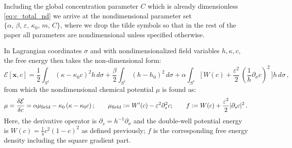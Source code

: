 \documentclass[
aip,
jcp,
reprint, 
floatfix
]{revtex4-1}
\begin{document}
Including the global concentration parameter $C$ which is already dimensionless  \eqref{eq:c_total_nd} we arrive at the nondimensional parameter set  $\{{\alpha},\,{\beta},\,{\varepsilon},\,{\kappa}_0,\, m,\,{C}\}$, where we drop the tilde symbols so that in the rest of the paper all parameters are nondimensional unless specified otherwise.

\begin{widetext}
In Lagrangian coordinates $\sigma$ and with nondimensionalized field variables $h, \kappa, c$, the free energy then takes the non-dimensional form:
\begin{equation}
\mathcal{E}[\mathbf{x},c]
=\frac{1}{2}\int_{S^1} (\kappa-\kappa_0 c)^2h\,d\sigma
+\frac{\beta}{2}\int_{S^1}(h-h_0)^2\,d\sigma
+\alpha\int_{S^1}\Big[\,W(c)+\frac{\varepsilon^2}{2}\,(\frac1h\partial_\sigma c)^2\,\Big]h \,d \sigma\,,
\label{eq:energy_full_nd}
\end{equation}
from which the nondimensional chemical potential $\mu$ is found as:
\begin{equation} \label{eq:chemical_potential_nd}
\mu=\frac{\delta \mathcal{E}}{\delta c}=\alpha\mu_{\rm field}-\kappa_0\left(\kappa-\kappa_0 c\right); \qquad \mu_{\rm field}:=W'(c)-\varepsilon^2 \partial_s^2c; \qquad f:=W(c)+\frac{\varepsilon^2}{2}|\partial_s c|^2\,.
\end{equation}
Here, the derivative operator is $\partial_s = h^{-1}\partial_\sigma$ and the double-well potential energy is $W(c)=\tfrac{1}{4}c^2(1-c)^2$ as defined previously; $f$ is the corresponding free energy density including the square gradient part. 


\end{widetext}
\end{document}
